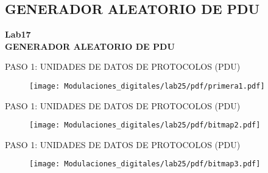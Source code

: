 \subsection{GENERADOR ALEATORIO DE PDU}
\begin{frame}{}


\bfseries{\textrm{\LARGE Lab17\\ \Large GENERADOR ALEATORIO DE PDU}}
\raggedright
\end{frame}





\begin{frame}{PASO 1: UNIDADES DE DATOS DE PROTOCOLOS (PDU)}

\begin{figure}[H]
\centering
\vspace{-3mm}
\texttt{[image: Modulaciones\_digitales/lab25/pdf/primera1.pdf]}
\end{figure}

\end{frame}

\begin{frame}{PASO 1: UNIDADES DE DATOS DE PROTOCOLOS (PDU)}

\begin{figure}[H]
\centering
\vspace{-3mm}
\texttt{[image: Modulaciones\_digitales/lab25/pdf/bitmap2.pdf]}
\end{figure}

\end{frame}

\begin{frame}{PASO 1: UNIDADES DE DATOS DE PROTOCOLOS (PDU)}

\begin{figure}[H]
\centering
\vspace{-3mm}
\texttt{[image: Modulaciones\_digitales/lab25/pdf/bitmap3.pdf]}
\end{figure}

\end{frame}

